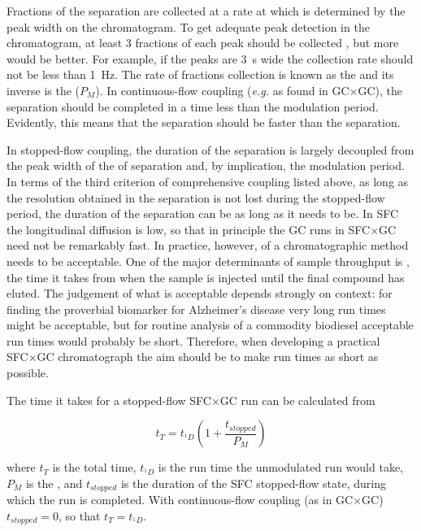 Fractions of the \oneD separation are collected at a rate at which is determined
by the peak width on the \oneD chromatogram. To get adequate peak detection in
the \oneD chromatogram, at least \num{3} fractions of each \oneD peak should be
collected \autocite{Murphy1998}, but more would be better. For example, if the peaks
are \SI{3}{s} wide the collection rate should not be less than \SI{1}{\hertz}.
The rate of fractions collection is known as the  and
its inverse is the  (\(P_M\)). In continuous-flow
coupling (\textit{e.g.} as found in GC×GC), the \twoD separation should be
completed in a time less than the modulation period. Evidently, this means that
the \twoD separation should be faster than the \oneD separation.

In stopped-flow coupling, the duration of the \twoD separation is largely
decoupled from the peak width of the of \oneD separation and, by implication,
the \oneD modulation period. In terms of the third criterion of comprehensive
coupling listed above, as long as the resolution obtained in the \oneD
separation is not lost during the stopped-flow period, the duration of the \twoD
separation can be as long as it needs to be. In SFC the longitudinal diffusion
is low, so that in principle the \twoD GC runs in SFC×GC need not be remarkably
fast. In practice, however,  of a chromatographic
method needs to be acceptable. One of the major determinants of sample
throughput is , the time it takes from when the sample is
injected until the final compound has eluted. The judgement of what is
acceptable depends strongly on context: for finding the proverbial biomarker for
Alzheimer's disease very long run times might be acceptable, but for routine
analysis of a commodity biodiesel acceptable run times would probably be short.
Therefore, when developing a practical SFC×GC chromatograph the aim should be to
make run times as short as possible.

The time it takes for a stopped-flow SFC×GC run can be calculated from

\[t_{T} = t_{^{1}D} ( 1 + \frac{t_{stopped}}{P_{M}} ) \]

where \(t_T\) is the total time, \(t_{^{1}D}\) is the run time the unmodulated
\oneD run would take, \(P_M\) is the , and
\(t_{stopped}\) is the duration of the SFC stopped-flow state, during which the
\oneD run is completed. With continuous-flow coupling (as in GC×GC) \(
t_{stopped}=0 \), so that \(t_{T} = t_{^{1}D}\).

